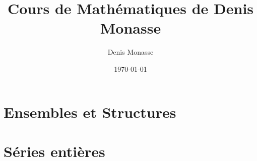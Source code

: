 \documentclass{Math}
\theoremstyle{plain}
\begin{document}
\title{Cours de Mathématiques de Denis Monasse}
\author{Denis Monasse}
\date{\today}
\maketitle

\tableofcontents

\newpage
\part{Ensembles et Structures}


 
 
% 
% 
% 
% 
% 
% 
% 
% 
% 
% 
% 
% 
% 
% 
% 
% 
% 
% 
% 
% 
% 
% 
% 
% 
% 
% 
% 
% 
% 
% 
% 
% 
% 
% 
% 
% 
% 
% 
% 
% 
% 
% 
% 
% 
% 
% 
% 
% 
% 
% 
% 
% 
% 
% 
% 
% 
% 
% 
\newpage
\part{Séries entières}

% 
% 
% 
% 
% 
% 
% 
% 
% 
% 
% 
% 
% 
% 
% 
% 
% 
% 
% 
% 
% 
% 
% 
% 
% 
% 
% 
% 
% 
% 
% 
% 
% 
% 
% 
% 
% 
% 
% 
% 
% 
% 
% 
% 

\printindex
\end{document}
